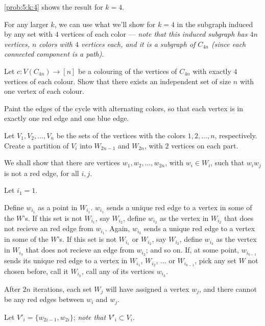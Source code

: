 \documentclass[10pt, a4paper]{article}
\begin{document}
\begin{sol}
	\cref{prob:5:k:4} shows the result for $k = 4$.

	For any larger $k$, we can use what we'll show for $k = 4$ in the subgraph induced by any set with $4$ vertices of each color --- \emph{note that this induced subgraph has $4n$ vertices, $n$ colors with $4$ vertices each, and it is a subgraph of $C_{4n}$ (since each connected component is a path)}.

	\begin{prop}\label{prob:5:k:4}
		Let $c: V(C_{4n}) \to [n]$ be a colouring of the vertices of $C_{4n}$ with exactly $4$ vertices of each colour. Show that there exists an independent set of size $n$ with one vertex of each colour.
	\end{prop}

	\begin{dem}
		Paint the edges of the cycle with alternating colors, so that each vertex is in exactly one red edge and one blue edge.

		Let $V_1, V_2, \dots, V_n$ be the sets of the vertices with the colors  $1, 2, \dots, n$, respectively. Create a partition of $V_i$ into $W_{2n-1}$ and $W_{2n}$, with  $2$ vertices on each part.

		We shall show that there are vertices $w_1, w_2, \dots, w_{2n}$, with $w_i \in W_i$, such that  $w_iw_j$ is not a red edge, for all $i, j$.

		\begin{dem}
		Let $i_1 = 1$.

		Define $w_{i_1}$ as a point in $W_{i_1}$. $w_{i_1}$ sends a unique red edge to a vertex in some of the $W$'s. If this set is not $W_{i_1}$, say $W_{i_2}$, define $w_{i_2}$ as the vertex in $W_{i_2}$ that does not recieve an red edge from $w_{i_1}$. Again, $w_{i_2}$ sends a unique red edge to a vertex in some of the $W$'s. If this set is not $W_{i_1}$ or $W_{i_2}$, say $W_{i_3}$, define $w_{i_3}$ as the vertex in $W_{i_3}$ that does not recieve an edge from $w_{i_2}$; and so on. If, at some point, $w_{i_{k-1}}$ sends its unique red edge to a vertex in $W_{i_1}$, $W_{i_2}$, $\dots$ or $W_{i_{k-1}}$, pick any set $W$ not chosen before, call it $W_{i_k}$, call any of its vertices $w_{i_k}$.

		After $2n$ iterations, each set $W_j$ will have assigned a vertex $w_j$, and there cannot be any red edges between $w_i$ and $w_j$.
		\end{dem}

		Let $V'_i = \{w_{2i-1}, w_{2i}\}$; \emph{note that $V'_i \subset V_i$}.


\end{dem}
\end{sol}
\end{document}
